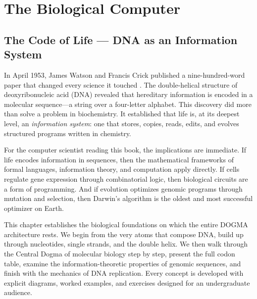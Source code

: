 
\part{The Biological Computer}

\chapter{The Code of Life --- DNA as an Information System}
\label{ch:code-of-life}


\noindent
In April 1953, James Watson and Francis Crick published a nine-hundred-word paper that changed every science it touched \citep{watson1953}. The double-helical structure of deoxyribonucleic acid (DNA) revealed that hereditary information is encoded in a molecular sequence---a string over a four-letter alphabet. This discovery did more than solve a problem in biochemistry. It established that life is, at its deepest level, an \emph{information system}: one that stores, copies, reads, edits, and evolves structured programs written in chemistry.

For the computer scientist reading this book, the implications are immediate. If life encodes information in sequences, then the mathematical frameworks of formal languages, information theory, and computation apply directly. If cells regulate gene expression through combinatorial logic, then biological circuits are a form of programming. And if evolution optimizes genomic programs through mutation and selection, then Darwin's algorithm is the oldest and most successful optimizer on Earth.

This chapter establishes the biological foundations on which the entire DOGMA architecture rests. We begin from the very atoms that compose DNA, build up through nucleotides, single strands, and the double helix. We then walk through the Central Dogma of molecular biology step by step, present the full codon table, examine the information-theoretic properties of genomic sequences, and finish with the mechanics of DNA replication. Every concept is developed with explicit diagrams, worked examples, and exercises designed for an undergraduate audience.

